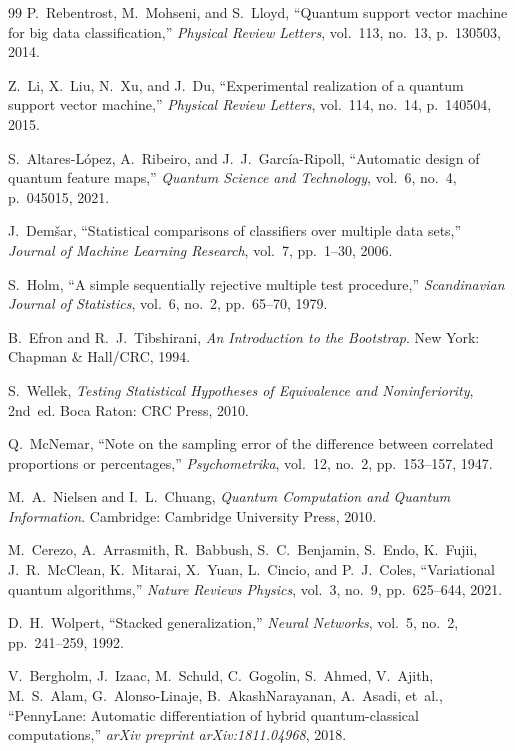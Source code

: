 \documentclass[journal,twocolumn]{IEEEtran}
\begin{document}
\begin{thebibliography}{99}
P.~Rebentrost, M.~Mohseni, and S.~Lloyd,
``Quantum support vector machine for big data classification,''
\emph{Physical Review Letters}, vol.~113, no.~13, p.~130503, 2014.

Z.~Li, X.~Liu, N.~Xu, and J.~Du,
``Experimental realization of a quantum support vector machine,''
\emph{Physical Review Letters}, vol.~114, no.~14, p.~140504, 2015.

S.~Altares-L{\'o}pez, A.~Ribeiro, and J.~J.~Garc{\'i}a-Ripoll,
``Automatic design of quantum feature maps,''
\emph{Quantum Science and Technology}, vol.~6, no.~4, p.~045015, 2021.

J.~Dem{\v s}ar,
``Statistical comparisons of classifiers over multiple data sets,''
\emph{Journal of Machine Learning Research}, vol.~7, pp.~1--30, 2006.

S.~Holm,
``A simple sequentially rejective multiple test procedure,''
\emph{Scandinavian Journal of Statistics}, vol.~6, no.~2, pp.~65--70, 1979.

B.~Efron and R.~J.~Tibshirani,
\emph{An Introduction to the Bootstrap}.
New York: Chapman \& Hall/CRC, 1994.

S.~Wellek,
\emph{Testing Statistical Hypotheses of Equivalence and Noninferiority}, 2nd~ed.
Boca Raton: CRC Press, 2010.

Q.~McNemar,
``Note on the sampling error of the difference between correlated proportions or percentages,''
\emph{Psychometrika}, vol.~12, no.~2, pp.~153--157, 1947.

M.~A.~Nielsen and I.~L.~Chuang,
\emph{Quantum Computation and Quantum Information}.
Cambridge: Cambridge University Press, 2010.

M.~Cerezo, A.~Arrasmith, R.~Babbush, S.~C.~Benjamin, S.~Endo, K.~Fujii, J.~R.~McClean, K.~Mitarai, X.~Yuan, L.~Cincio, and P.~J.~Coles,
``Variational quantum algorithms,''
\emph{Nature Reviews Physics}, vol.~3, no.~9, pp.~625--644, 2021.

D.~H.~Wolpert,
``Stacked generalization,''
\emph{Neural Networks}, vol.~5, no.~2, pp.~241--259, 1992.

V.~Bergholm, J.~Izaac, M.~Schuld, C.~Gogolin, S.~Ahmed, V.~Ajith, M.~S.~Alam, G.~Alonso-Linaje, B.~AkashNarayanan, A.~Asadi, et~al.,
``PennyLane: Automatic differentiation of hybrid quantum-classical computations,''
\emph{arXiv preprint arXiv:1811.04968}, 2018.


\end{thebibliography}
\end{document}
